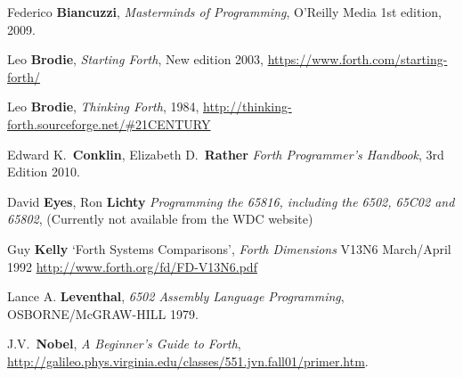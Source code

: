 \begin{thebibliography}{99}

        Federico \textbf{Biancuzzi},
  	\textit{Masterminds of Programming},
	O'Reilly Media
  	1st edition,
	2009.

        Leo \textbf{Brodie},
  	\textit{Starting Forth},
  	New edition 2003,
        \href{https://www.forth.com/starting-forth/}{https://www.forth.com/starting-forth/}

        Leo \textbf{Brodie},
  	\textit{Thinking Forth},
  	1984,
        \href{http://thinking-forth.sourceforge.net/\#21CENTURY}{http://thinking-forth.sourceforge.net/\#21CENTURY}

        Edward K.~\textbf{Conklin}, Elizabeth D.~\textbf{Rather}
  	\textit{Forth Programmer's Handbook},
  	3rd Edition
        2010.

        David \textbf{Eyes}, Ron \textbf{Lichty}
  	\textit{Programming the 65816, including the 6502, 65C02 and 65802},
        (Currently not available from the WDC website) 

        Guy \textbf{Kelly}
  	`Forth Systems Comparisons',
        \textit{Forth Dimensions} V13N6
        March/April 1992
        \href{http://www.forth.org/fd/FD-V13N6.pdf}{http://www.forth.org/fd/FD-V13N6.pdf}

        Lance A. \textbf{Leventhal},
  	\textit{6502 Assembly Language Programming},
	OSBORNE/McGRAW-HILL
	1979.

        J.V.~\textbf{Nobel},
  	\textit{A Beginner's Guide to Forth},
        \href{http://galileo.phys.virginia.edu/classes/551.jvn.fall01/primer.htm}{http://galileo.phys.virginia.edu/classes/551.jvn.fall01/primer.htm}.

\end{thebibliography}

